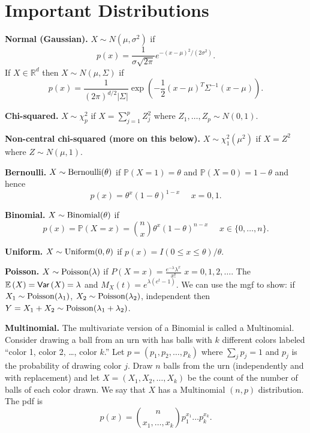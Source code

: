 \documentclass[twoside,12pt]{article}
\begin{document}
\section{Important Distributions}

{\bf Normal (Gaussian).}
$X\sim N(\mu,\sigma^2)$ if
$$
p(x) = \frac{1}{\sigma\sqrt{2\pi}}e^{-(x-\mu)^2/(2\sigma^2)}.
$$
If $X \in \mathbb{R}^d$ then
$X\sim N(\mu,\Sigma)$ if
$$
p(x) = \frac{1}{ (2\pi)^{d/2} |\Sigma|} \exp\left( - \frac{1}{2} (x-\mu)^T \Sigma^{-1} (x-\mu)\right).
$$

\vspace{.2cm}

{\bf Chi-squared.}
$X\sim \chi^2_p$ if
$X = \sum_{j=1}^p Z_j^2$
where
$Z_1,\ldots, Z_p\sim N(0,1)$.

{\bf Non-central chi-squared (more on this below).} $X \sim \chi^2_1(\mu^2)$ if $X = Z^2$ where $Z \sim N(\mu,1)$.

\vspace{.2cm}

{\bf Bernoulli.}
$X\sim {\rm Bernoulli}(\theta)$ if
$\mathbb{P}(X=1)=\theta$ and 
$\mathbb{P}(X=0)=1-\theta$ and hence
$$
p(x)= \theta^x (1-\theta)^{1-x}\ \ \ \ \ \ x=0,1.
$$

\vspace{.2cm}

{\bf Binomial.}
$X\sim {\rm Binomial}(\theta)$ if
$$
p(x)=\mathbb{P}(X=x) = \binom{n}{x} \theta^x (1-\theta)^{n-x}
\ \ \ \ \ \ x\in\{0,\ldots, n\}.
$$

\vspace{.2cm}

{\bf Uniform.}
$X\sim {\rm Uniform}(0,\theta)$ if
$p(x) = I(0 \leq x \leq \theta)/\theta$.


\vspace{.2cm}

{\bf Poisson.}
$X\sim {\rm Poisson}(\lambda)$ if
$P(X=x) = \frac{e^{-\lambda}\lambda^x}{x!}$  $x=0,1,2,\ldots$.
The
$\mathbb{E}\left(X\right) = {\sf Var}\left(X\right) = \lambda$
and
$M_X(t) = e^{\lambda({e^t}-1)}$. 
We can use
the mgf to show: if $X_1 \sim {\rm Poisson}(\lambda_1)$, $X_2 \sim  {\rm Poisson}(\lambda_2)$,
independent then
$Y=X_1 + X_2 \sim {\rm Poisson} (\lambda_1 + \lambda_2)$.

\vspace{.2cm}

{\bf Multinomial.}
The multivariate version of a Binomial is called a Multinomial.  Consider
drawing a ball from an urn with has balls with $k$ different colors 
labeled ``color 1, color 2, \ldots, color $k$.''  Let $p=(p_1,p_2,\ldots,p_k)$
where $\sum_j p_j =1$ and $p_j$ is the probability of drawing color $j$.  Draw
$n$ balls from the urn
(independently and with replacement) and let $X=(X_1,X_2,\ldots,X_k)$ be 
the count of the number of balls of each color drawn.  We say that $X$ has
a Multinomial $(n,p)$ distribution. The pdf is 
$$ 
p(x) = {n \choose {x_1,\ldots,x_k}} p_1^{x_1}\ldots p_k^{x_k}.
$$
\end{document}
